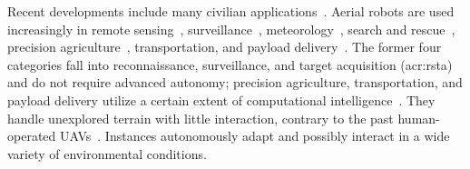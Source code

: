 Recent developments include many civilian applications~\citep{gonzalez2017unmanned}. Aerial robots are used increasingly in remote sensing~\citep{colomina2014unmanned,noor2018remote,tang2015drone,milas2018drones}, surveillance~\citep{acevedo2014one,ramasamy2017heuristic,basilico2015deploying,paucar2018use,burkle2009collaborating}, meteorology~\citep{renzaglia2016monitoring,schuyler2019using}, search and rescue~\citep{hayat2017multi,pensieri2020drones,karaca2018potential,cui2015drones,seguin2018unmanned}, precision agriculture~\citep{popovic2017online,sa2018weednet,lottes2017uav,daponte2019review,puri2017agriculture}, transportation, and payload delivery~\citep{kellermann2020drones}. The former four categories fall into reconnaissance, surveillance, and target acquisition (\Gls{acr:rsta}) and do not require advanced autonomy; precision agriculture, transportation, and payload delivery utilize a certain extent of computational intelligence~\citep{siciliano2016springer}. They handle unexplored terrain with little interaction, contrary to the past human-operated UAVs~\citep{siciliano2016springer}. Instances autonomously adapt and possibly interact in a wide variety of environmental conditions.

